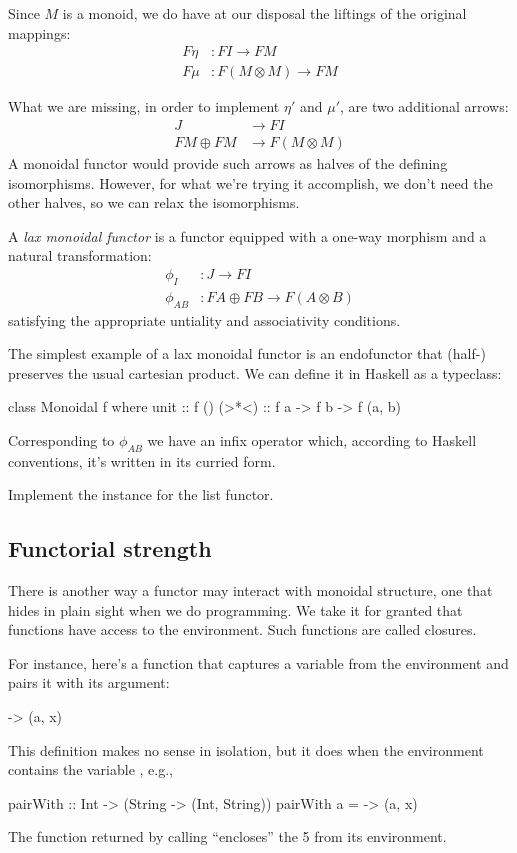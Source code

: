 \documentclass[DaoFP]{subfiles}
\begin{document}
Since $M$ is a monoid, we do have at our disposal the liftings of the original mappings:
\begin{align*}
 F \eta &\colon F I \to F M \\
 F \mu &\colon F (M \otimes M) \to F M
\end{align*}

What we are missing, in order to implement $\eta'$ and $\mu'$, are two additional arrows:
\begin{align*}
J &\to F I\\
 F M \oplus F M &\to F (M \otimes M)
 \end{align*}
A monoidal functor would provide such arrows as halves of the defining isomorphisms. However, for what we're trying it accomplish, we don't need the other halves, so we can relax the isomorphisms. 

A \emph{lax monoidal functor} is a functor equipped with a one-way morphism and a natural transformation:
\begin{align*}
\phi_I &\colon J \to F I \\
\phi_{A B} &\colon F A \oplus F B \to F (A \otimes B)
\end{align*}
satisfying the appropriate untiality and associativity conditions.

The simplest example of a lax monoidal functor is an endofunctor that (half-) preserves the usual cartesian product. We can define it in Haskell as a typeclass:

\begin{haskell}
class Monoidal f where
  unit  :: f ()
  (>*<) :: f a -> f b -> f (a, b)
\end{haskell}
Corresponding to $\phi_{A B}$ we have an infix operator which, according to Haskell conventions, it's written in its curried form.

\begin{exercise}
Implement the  instance for the list functor.
\end{exercise}

\subsection{Functorial strength}

There is another way a functor may interact with monoidal structure, one that hides in plain sight when we do programming. We take it for granted that functions have access to the environment. Such functions are called closures. 

For instance, here's a function that captures a variable  from the environment and pairs it with its argument:
\begin{haskell}
\x -> (a, x)
\end{haskell}
This definition makes no sense in isolation, but it does when the environment contains the variable , e.g.,
\begin{haskell}
pairWith :: Int -> (String -> (Int, String))
pairWith a = \x -> (a, x)
\end{haskell}
The function returned by calling  ``encloses'' the 5 from its environment.
\end{document}
